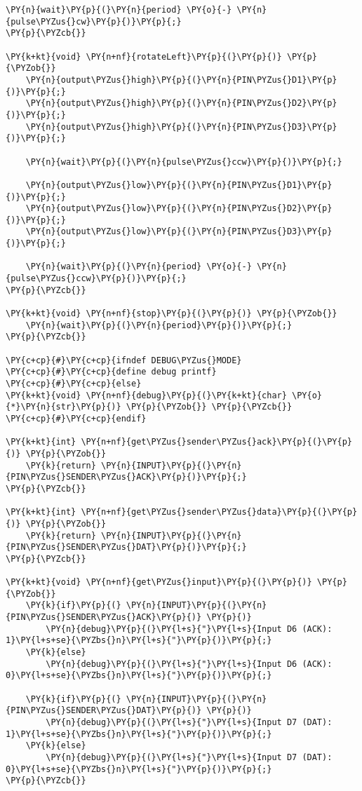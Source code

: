 \begin{Verbatim}[commandchars=\\\{\}]
    \PY{n}{wait}\PY{p}{(}\PY{n}{period} \PY{o}{-} \PY{n}{pulse\PYZus{}cw}\PY{p}{)}\PY{p}{;}
\PY{p}{\PYZcb{}}

\PY{k+kt}{void} \PY{n+nf}{rotateLeft}\PY{p}{(}\PY{p}{)} \PY{p}{\PYZob{}}
    \PY{n}{output\PYZus{}high}\PY{p}{(}\PY{n}{PIN\PYZus{}D1}\PY{p}{)}\PY{p}{;}
    \PY{n}{output\PYZus{}high}\PY{p}{(}\PY{n}{PIN\PYZus{}D2}\PY{p}{)}\PY{p}{;}
    \PY{n}{output\PYZus{}high}\PY{p}{(}\PY{n}{PIN\PYZus{}D3}\PY{p}{)}\PY{p}{;}

    \PY{n}{wait}\PY{p}{(}\PY{n}{pulse\PYZus{}ccw}\PY{p}{)}\PY{p}{;}

    \PY{n}{output\PYZus{}low}\PY{p}{(}\PY{n}{PIN\PYZus{}D1}\PY{p}{)}\PY{p}{;}
    \PY{n}{output\PYZus{}low}\PY{p}{(}\PY{n}{PIN\PYZus{}D2}\PY{p}{)}\PY{p}{;}
    \PY{n}{output\PYZus{}low}\PY{p}{(}\PY{n}{PIN\PYZus{}D3}\PY{p}{)}\PY{p}{;}

    \PY{n}{wait}\PY{p}{(}\PY{n}{period} \PY{o}{-} \PY{n}{pulse\PYZus{}ccw}\PY{p}{)}\PY{p}{;}
\PY{p}{\PYZcb{}}

\PY{k+kt}{void} \PY{n+nf}{stop}\PY{p}{(}\PY{p}{)} \PY{p}{\PYZob{}}
    \PY{n}{wait}\PY{p}{(}\PY{n}{period}\PY{p}{)}\PY{p}{;}
\PY{p}{\PYZcb{}}

\PY{c+cp}{#}\PY{c+cp}{ifndef DEBUG\PYZus{}MODE}
\PY{c+cp}{#}\PY{c+cp}{define debug printf}
\PY{c+cp}{#}\PY{c+cp}{else}
\PY{k+kt}{void} \PY{n+nf}{debug}\PY{p}{(}\PY{k+kt}{char} \PY{o}{*}\PY{n}{str}\PY{p}{)} \PY{p}{\PYZob{}} \PY{p}{\PYZcb{}}
\PY{c+cp}{#}\PY{c+cp}{endif}

\PY{k+kt}{int} \PY{n+nf}{get\PYZus{}sender\PYZus{}ack}\PY{p}{(}\PY{p}{)} \PY{p}{\PYZob{}}
    \PY{k}{return} \PY{n}{INPUT}\PY{p}{(}\PY{n}{PIN\PYZus{}SENDER\PYZus{}ACK}\PY{p}{)}\PY{p}{;}
\PY{p}{\PYZcb{}}

\PY{k+kt}{int} \PY{n+nf}{get\PYZus{}sender\PYZus{}data}\PY{p}{(}\PY{p}{)} \PY{p}{\PYZob{}}
    \PY{k}{return} \PY{n}{INPUT}\PY{p}{(}\PY{n}{PIN\PYZus{}SENDER\PYZus{}DAT}\PY{p}{)}\PY{p}{;}
\PY{p}{\PYZcb{}}

\PY{k+kt}{void} \PY{n+nf}{get\PYZus{}input}\PY{p}{(}\PY{p}{)} \PY{p}{\PYZob{}}
    \PY{k}{if}\PY{p}{(} \PY{n}{INPUT}\PY{p}{(}\PY{n}{PIN\PYZus{}SENDER\PYZus{}ACK}\PY{p}{)} \PY{p}{)}
        \PY{n}{debug}\PY{p}{(}\PY{l+s}{"}\PY{l+s}{Input D6 (ACK): 1}\PY{l+s+se}{\PYZbs{}n}\PY{l+s}{"}\PY{p}{)}\PY{p}{;}
    \PY{k}{else}
        \PY{n}{debug}\PY{p}{(}\PY{l+s}{"}\PY{l+s}{Input D6 (ACK): 0}\PY{l+s+se}{\PYZbs{}n}\PY{l+s}{"}\PY{p}{)}\PY{p}{;}

    \PY{k}{if}\PY{p}{(} \PY{n}{INPUT}\PY{p}{(}\PY{n}{PIN\PYZus{}SENDER\PYZus{}DAT}\PY{p}{)} \PY{p}{)}
        \PY{n}{debug}\PY{p}{(}\PY{l+s}{"}\PY{l+s}{Input D7 (DAT): 1}\PY{l+s+se}{\PYZbs{}n}\PY{l+s}{"}\PY{p}{)}\PY{p}{;}
    \PY{k}{else}
        \PY{n}{debug}\PY{p}{(}\PY{l+s}{"}\PY{l+s}{Input D7 (DAT): 0}\PY{l+s+se}{\PYZbs{}n}\PY{l+s}{"}\PY{p}{)}\PY{p}{;}
\PY{p}{\PYZcb{}}


\end{Verbatim}
